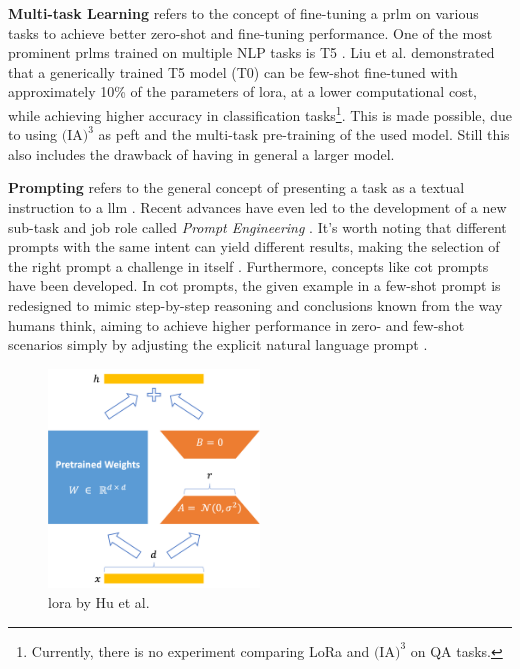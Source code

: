 \textbf{Multi-task Learning} refers to the concept of fine-tuning a \gls{prlm} on various tasks to achieve better zero-shot and fine-tuning performance. One of the most prominent \gls{prlm}s trained on multiple NLP tasks is T5 \cite{raffel_exploring_2023}. Liu et al. \cite{liu_few-shot_2022} demonstrated that a generically trained T5 model (T0) can be few-shot fine-tuned with approximately 10\% of the parameters of \gls{lora}, at a lower computational cost, while achieving higher accuracy in classification tasks\footnote{Currently, there is no experiment comparing LoRa and $\text{(IA)}^3$ on QA tasks.}. This is made possible, due to using $\text{(IA)}^3$ as \gls{peft} and the multi-task pre-training of the used model. Still this also includes the drawback of having in general a larger model.

\textbf{Prompting} refers to the general concept of presenting a task as a textual instruction to a \gls{llm} \cite{brown_language_2020}. Recent advances have even led to the development of a new sub-task and job role called \textit{Prompt Engineering} \cite{white_prompt_2023}. It's worth noting that different prompts with the same intent can yield different results, making the selection of the right prompt a challenge in itself \cite{liu_gpt_2021}. Furthermore, concepts like \gls{cot} prompts have been developed. In \gls{cot} prompts, the given example in a few-shot prompt is redesigned to mimic step-by-step reasoning and conclusions known from the way humans think, aiming to achieve higher performance in zero- and few-shot scenarios simply by adjusting the explicit natural language prompt \cite{wei_chain--thought_2023}.

\begin{figure}
    \centering
    \includegraphics[width=0.5\textwidth]{Grafiken/Lora.png}
    \caption{\gls{lora} by Hu et al. \cite{hu_lora_nodate}}
    \label{fig:lora}
\end{figure}


